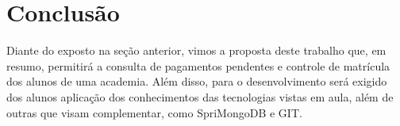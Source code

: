 \chapter{Conclusão}\label{cap_conclu}

Diante do exposto na seção anterior, vimos a proposta deste trabalho que, em resumo, permitirá a consulta de pagamentos pendentes e controle de matrícula dos alunos de uma academia. Além disso, para o desenvolvimento será exigido dos alunos aplicação dos conhecimentos das tecnologias vistas em aula, além de outras que visam complementar, como SpriMongoDB e GIT.